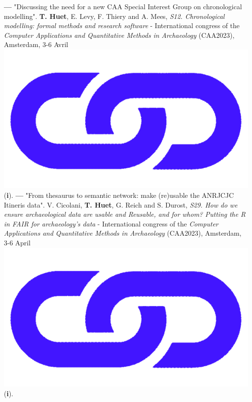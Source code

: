 \documentclass{article}
\begin{document}
\smallbreak
\textbf{--- }"Discussing the need for a new CAA Special Interest Group on chronological modelling". \textbf{T. Huet}, E. Levy, F. Thiery and A. Mees, \textit{S12. Chronological modelling: formal methods and research software} - International congress of the \textit{Computer Applications and Quantitative Methods in Archaeology} (CAA2023), Amsterdam, 3-6 Avril \href{https://historical-time.github.io/caa23/sig/pres}{\includegraphics[scale=0.02]{link_darkblue.png}} (\textbf{i}).
\smallbreak
\textbf{--- }"From thesaurus to semantic network: make (re)usable the ANRJCJC Itineris data". V. Cicolani, \textbf{T. Huet}, G. Reich and S. Durost, \textit{S29. How do we ensure archaeological data are usable and Reusable, and for whom? Putting the R in FAIR for archaeology's data} - International congress of the \textit{Computer Applications and Quantitative Methods in Archaeology} (CAA2023), Amsterdam, 3-6 April \href{https://anr-itineris.github.io/itineris/talk/caa-2023/thesaurus/pres/#/title-slide}{\includegraphics[scale=0.02]{link_darkblue.png}} (\textbf{i}).
\smallbreak
\end{document}
